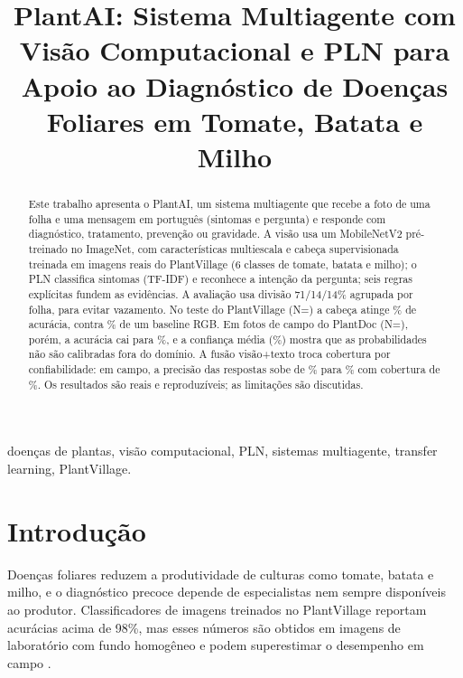 \documentclass[conference]{IEEEtran}
\begin{document}
\title{PlantAI: Sistema Multiagente com Visão Computacional e PLN para Apoio ao Diagnóstico de Doenças Foliares em Tomate, Batata e Milho}

\author{
}

\date{}
\maketitle

\begin{abstract}
Este trabalho apresenta o PlantAI, um sistema multiagente que recebe a foto de uma folha e uma mensagem em português (sintomas e pergunta) e responde com diagnóstico, tratamento, prevenção ou gravidade. A visão usa um MobileNetV2 pré-treinado no ImageNet, com características multiescala e cabeça supervisionada treinada em imagens reais do PlantVillage (6 classes de tomate, batata e milho); o PLN classifica sintomas (TF-IDF) e reconhece a intenção da pergunta; seis regras explícitas fundem as evidências. A avaliação usa divisão 71/14/14\% agrupada por folha, para evitar vazamento. No teste do PlantVillage (N=\nTest) a cabeça atinge \accMobile\% de acurácia, contra \accRGB\% de um baseline RGB. Em fotos de campo do PlantDoc (N=\nPlantDoc), porém, a acurácia cai para \pdAcc\%, e a confiança média (\pdConf\%) mostra que as probabilidades não são calibradas fora do domínio. A fusão visão+texto troca cobertura por confiabilidade: em campo, a precisão das respostas sobe de \selVisPD\% para \selIntPD\% com cobertura de \covIntPD\%. Os resultados são reais e reproduzíveis; as limitações são discutidas.
\end{abstract}

\begin{IEEEkeywords}
doenças de plantas, visão computacional, PLN, sistemas multiagente, transfer learning, PlantVillage.
\end{IEEEkeywords}

\section{Introdução}
Doenças foliares reduzem a produtividade de culturas como tomate, batata e milho, e o diagnóstico precoce depende de especialistas nem sempre disponíveis ao produtor. Classificadores de imagens treinados no PlantVillage \cite{hughes2015,mohanty2016} reportam acurácias acima de 98\%, mas esses números são obtidos em imagens de laboratório com fundo homogêneo e podem superestimar o desempenho em campo \cite{noyan2022,singh2020}.
\end{document}
